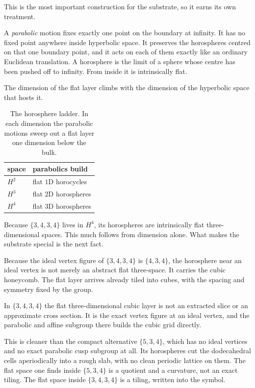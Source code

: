 This is the most important construction for the substrate, so it earns its own treatment.

A \emph{parabolic} motion fixes exactly one point on the boundary at infinity. It has no fixed point anywhere inside hyperbolic space. It preserves the horospheres centred on that one boundary point, and it acts on each of them exactly like an ordinary Euclidean translation. A horosphere is the limit of a sphere whose centre has been pushed off to infinity. From inside it is intrinsically flat.

The dimension of the flat layer climbs with the dimension of the hyperbolic space that hosts it.

\begin{table}[ht]
\centering
\begin{tabular}{@{}ll@{}}
\toprule
space & parabolics build \\
\midrule
$H^2$ & flat $1$D horocycles \\
$H^3$ & flat $2$D horospheres \\
$H^4$ & flat $3$D horospheres \\
\bottomrule
\end{tabular}
\caption{The horosphere ladder. In each dimension the parabolic motions sweep out a flat layer one dimension below the bulk.}
\label{tab:horosphere-ladder}
\end{table}

Because $\{3,4,3,4\}$ lives in $H^4$, its horospheres are intrinsically flat three-dimensional spaces. This much follows from dimension alone. What makes the substrate special is the next fact.

Because the ideal vertex figure of $\{3,4,3,4\}$ is $\{4,3,4\}$, the horosphere near an ideal vertex is not merely an abstract flat three-space. It carries the cubic honeycomb. The flat layer arrives already tiled into cubes, with the spacing and symmetry fixed by the group.

\begin{result}
In $\{3,4,3,4\}$ the flat three-dimensional cubic layer is not an extracted slice or an approximate cross section. It is the exact vertex figure at an ideal vertex, and the parabolic and affine subgroup there builds the cubic grid directly.
\end{result}

This is cleaner than the compact alternative $\{5,3,4\}$, which has no ideal vertices and no exact parabolic cusp subgroup at all. Its horospheres cut the dodecahedral cells aperiodically into a rough slab, with no clean periodic lattice on them. The flat space one finds inside $\{5,3,4\}$ is a quotient and a curvature, not an exact tiling. The flat space inside $\{3,4,3,4\}$ is a tiling, written into the symbol.

